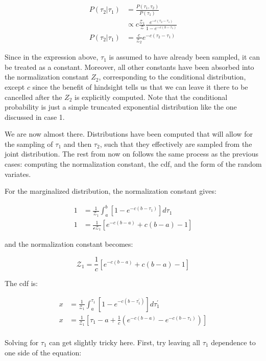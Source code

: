 \documentclass[12pt, two sided]{article}
\begin{document}
\begin{align}
P(\tau_2 \vert \tau_1) &= \frac{P(\tau_1,\tau_2)}{P(\tau_1)} \\
&\propto c \frac{\mathcal{Z_1}}{\mathcal{Z}} \frac{e^{-c(\tau_2-\tau_1)}}{1-e^{-c(b-\tau_1)}} \\
P(\tau_2 \vert \tau_1) &= \frac{c}{\mathcal{Z_2}} e^{-c(\tau_2-\tau_1)}
\end{align}

Since in the expression above, $\tau_1$ is assumed to have already been sampled, it can be treated as a constant. Moreover, all other constants have been absorbed into the normalization constant $Z_2$, corresponding to the conditional distribution, except $c$ since the benefit of hindsight tells us that we can leave it there to be cancelled after the $Z_2$ is explicitly computed. Note that the conditional probability is just a simple truncated exponential distribution like the one discussed in case 1.

We are now almost there. Distributions have been computed that will allow for the sampling of $\tau_1$ and then $\tau_2$, such that they effectively are sampled from the joint distribution. The rest from now on follows the same process as the previous cases: computing the normalization constant, the cdf, and the form of the random variates.

For the marginalized distribution, the normalization constant gives:

\begin{align}
1 &= \frac{1}{\mathcal{Z_1}} \int_{a}^{b} [ 1-e^{-c(b-\tau_1)} ] d\tau_1\\
1 &= \frac{1}{\mathcal{c Z_1}} [e^{-c(b-a)}+c(b-a)-1]
\end{align}

and the normalization constant becomes:

\begin{equation}
\mathcal{Z_1} = \frac{1}{c} [e^{-c(b-a)}+c(b-a)-1]
\end{equation}

The cdf is: 

\begin{align}
x &= \frac{1}{\mathcal{Z_1}} \int_{a}^{\tau_1} [ 1-e^{-c(b-\tau^{\prime}_1)} ] d\tau^{\prime}_1\\
x &= \frac{1}{\mathcal{Z_1}} [\tau_1 - a + \frac{1}{c} (e^{-c(b-a)}-e^{-c(b-\tau_1)})] \\
\end{align}

Solving for $\tau_1$ can get slightly tricky here. First, try leaving all $\tau_1$ dependence to one side of the equation:
\end{document}
